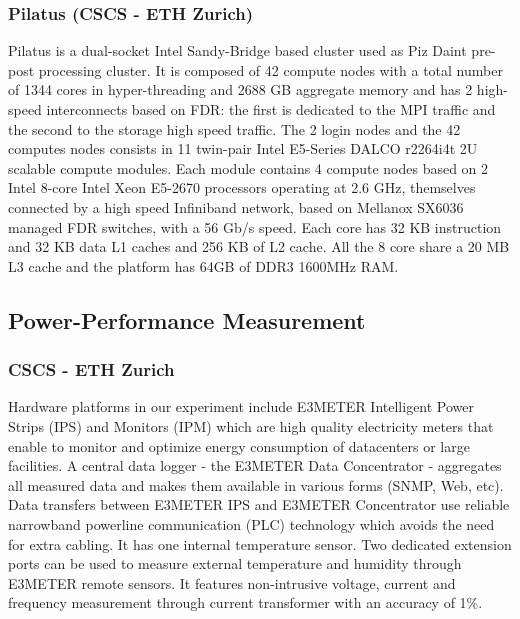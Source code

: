 \subsubsection{Pilatus (CSCS - ETH Zurich)}
Pilatus is a dual-socket Intel  Sandy-Bridge based cluster used as Piz
Daint pre-post processing cluster.  It is composed of 42 compute nodes
with  a total  number of  1344 cores  in hyper-threading  and  2688 GB
aggregate memory and has 2  high-speed interconnects based on FDR: the
first is  dedicated to the MPI  traffic and the second  to the storage
high  speed traffic.   The 2  login nodes  and the  42  computes nodes
consists in  11 twin-pair Intel  E5-Series DALCO r2264i4t  2U scalable
compute  modules.  Each  module contains  4 compute  nodes based  on 2
Intel  8-core Intel  Xeon  E5-2670 processors  operating  at 2.6  GHz,
themselves  connected by  a high  speed Infiniband  network,  based on
Mellanox SX6036 managed FDR switches,  with a 56 Gb/s speed. Each core
has  32 KB  instruction and  32 KB  data L1  caches and  256 KB  of L2
cache. All the 8 core share a 20 MB L3 cache and the platform has 64GB
of DDR3 1600MHz RAM.

\subsection{Power-Performance Measurement}
\label{subsec:2.2}

\subsubsection{CSCS - ETH Zurich}
Hardware platforms in our experiment include E3METER Intelligent Power
Strips  (IPS) and Monitors  (IPM) which  are high  quality electricity
meters  that enable  to  monitor and  optimize  energy consumption  of
datacenters or large facilities.  A  central data logger - the E3METER
Data  Concentrator  - aggregates  all  measured  data  and makes  them
available in  various forms (SNMP,  Web, etc). Data  transfers between
E3METER IPS and E3METER Concentrator use reliable narrowband powerline
communication  (PLC)  technology  which  avoids  the  need  for  extra
cabling.   It  has one  internal  temperature  sensor.  Two  dedicated
extension  ports  can be  used  to  measure  external temperature  and
humidity  through E3METER remote  sensors.  It  features non-intrusive
voltage, current and frequency measurement through current transformer
with an accuracy of 1\%.

